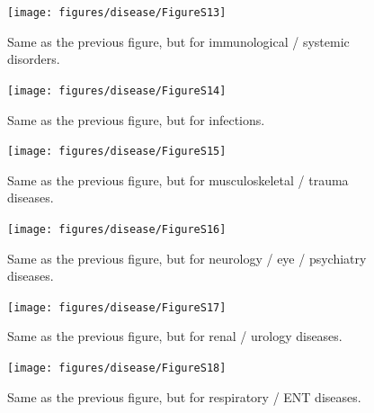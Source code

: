 \documentclass[12pt,twoside]{unicam}
\begin{document}
\begin{figure}

{\centering \texttt{[image: figures/disease/FigureS13]} 

}

\caption[Age-of-onset distributions for the immunological / systemic disorders.]{Same as the previous figure, but for immunological / systemic disorders.}\label{fig:disFigS13}
\end{figure}

\begin{figure}

{\centering \texttt{[image: figures/disease/FigureS14]} 

}

\caption[Age-of-onset distributions for infections.]{Same as the previous figure, but for infections.}\label{fig:disFigS14}
\end{figure}

\begin{figure}

{\centering \texttt{[image: figures/disease/FigureS15]} 

}

\caption[Age-of-onset distributions for the musculoskeletal / trauma diseases.]{Same as the previous figure, but for musculoskeletal / trauma diseases.}\label{fig:disFigS15}
\end{figure}

\begin{figure}

{\centering \texttt{[image: figures/disease/FigureS16]} 

}

\caption[Age-of-onset distributions for the neurology / eye / psychiatry diseases.]{Same as the previous figure, but for neurology / eye / psychiatry diseases.}\label{fig:disFigS16}
\end{figure}

\begin{figure}

{\centering \texttt{[image: figures/disease/FigureS17]} 

}

\caption[Age-of-onset distributions for the renal / urology diseases.]{Same as the previous figure, but for renal / urology diseases.}\label{fig:disFigS17}
\end{figure}

\begin{figure}

{\centering \texttt{[image: figures/disease/FigureS18]} 

}

\caption[Age-of-onset distributions for the respiratory / ENT diseases.]{Same as the previous figure, but for respiratory / ENT diseases.}\label{fig:disFigS18}
\end{figure}
\end{document}
